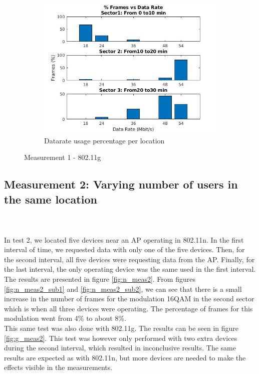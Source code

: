 \documentclass[12]{article}
\begin{document}
\begin{figure}[!htb]
\hspace*{-1.2cm}
\begin{subfigure}{.5\textwidth}
  \includegraphics[width=\linewidth]{"measurement 1/g_fig3"}
  \caption{Datarate usage percentage per location}
  \label{fig:g_meas1_sub3}
\end{subfigure}
\caption{Measurement 1 - 802.11g}
\label{fig:g_meas1}
\end{figure}

\newpage
\subsection{Measurement 2: Varying number of users in the same location}\\\\

In test 2, we located five devices near an AP operating in 802.11n. In the first interval of time, we requested data with only one of the five devices. Then, for the second interval, all five devices were requesting data from the AP. Finally, for the last interval, the only operating device was the same used in the first interval. The results are presented in figure \ref{fig:n_meas2}. From figures \ref{fig:n_meas2_sub1} and \ref{fig:n_meas2_sub2}, we can see that there is a small increase in the number of frames for the modulation 16QAM in the second sector which is when all three devices were operating. The percentage of frames for this modulation went from 4\% to about 8\%.
\\
This same test was also done with 802.11g. The results can be seen in figure \ref{fig:g_meas2}. This test was however only performed with two extra devices during the second interval, which resulted in inconclusive results. The same results are expected as with 802.11n, but more devices are needed to make the effects visible in the measurements.
\end{document}
